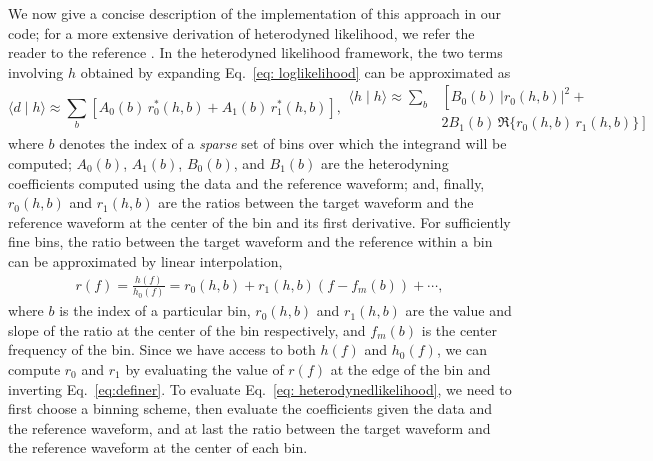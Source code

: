 \documentclass[twocolumn]{aastex631}
\begin{document}
We now give a concise description of the implementation of this approach in our
code; for a more extensive derivation of heterodyned likelihood, we refer the
reader to the reference \cite{Zackay:2018qdy}. In the heterodyned likelihood
framework, the two terms involving $h$ obtained by expanding Eq.~\eqref{eq:
loglikelihood} can be approximated as
\begin{subequations} \label{eq: heterodynedlikelihood}
\begin{equation}
    \langle d \mid h \rangle \approx \sum_b \left[ A_0(b)\, r^*_0(h,b) + A_1(b)\, r^*_1(h,b) \right] ,
\end{equation}
\begin{align}
    \langle h \mid h \rangle \approx \sum_b &\left[ B_0(b)\, |r_0(h,b)|^2 + \right. \nonumber \\
    &\left. 2 B_1(b)\, \Re\{r_0(h,b)\, r_1(h,b)\} \right] 
\end{align}
\end{subequations} 
where $b$ denotes the index of a \textit{sparse} set of bins over which the integrand
will be computed; $A_0(b)$, $A_1(b)$, $B_0(b)$, and $B_1(b)$ are the
heterodyning coefficients computed using the data and the reference waveform;
and, finally, $r_0(h,b)$ and $r_1(h,b)$ are the ratios between the target waveform and the
reference waveform at the center of the bin and its first derivative.
For sufficiently fine bins, the ratio between the target waveform
and the reference within a bin can be approximated by linear interpolation,
\begin{align}
r(f) = \frac{h(f)}{h_0(f)} = r_0(h,b) + r_1(h,b)(f- f_m(b)) + \cdots,
\label{eq:definer}
\end{align}
where $b$ is the index of a particular bin, $r_0(h,b)$ and $r_1(h,b)$ are the
value and slope of the ratio at the center of the bin respectively, and
$f_m(b)$ is the center frequency of the bin. Since we have access to both $h(f)$
and $h_0(f)$, we can compute $r_0$ and $r_1$ by evaluating the value of $r(f)$
at the edge of the bin and inverting Eq.~\eqref{eq:definer}.
To evaluate Eq.~\eqref{eq: heterodynedlikelihood}, we need to first choose a
binning scheme, then evaluate the coefficients given the data and the reference
waveform, and at last the ratio between the target waveform and the reference
waveform at the center of each bin.
\end{document}
